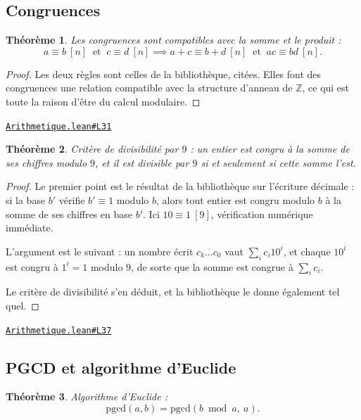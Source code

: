 \documentclass[11pt,a4paper]{article}
\theoremstyle{definition}
\theoremstyle{plain}
\newtheorem{theoreme}{Théorème}
\newcommand{\source}[2]{\par\smallskip\noindent\hfill{\footnotesize\href{#1}{\texttt{#2}}}\par\smallskip}
\begin{document}
\subsection{Congruences}

\begin{theoreme}
Les congruences sont compatibles avec la somme et le produit :
\[ a \equiv b \ [n] \ \text{ et } \ c \equiv d \ [n]
   \implies a + c \equiv b + d \ [n] \ \text{ et } \ ac \equiv bd \ [n] . \]
\end{theoreme}

\begin{proof}
Les deux règles sont celles de la bibliothèque, citées. Elles font des congruences une
relation compatible avec la structure d'anneau de $\mathbb{Z}$, ce qui est toute la raison
d'être du calcul modulaire.
\end{proof}
\source{https://github.com/Commutator-IO/learn-lean/blob/main/cours/02-lycee/10-specialite-mathematiques-terminale-s/Arithmetique.lean\#L31}{Arithmetique.lean\#L31}

\begin{theoreme}
Critère de divisibilité par $9$ : un entier est congru à la somme de ses chiffres
modulo $9$, et il est divisible par $9$ si et seulement si cette somme l'est.
\end{theoreme}

\begin{proof}
Le premier point est le résultat de la bibliothèque sur l'écriture décimale : si la base
$b'$ vérifie $b' \equiv 1$ modulo $b$, alors tout entier est congru modulo $b$ à la somme
de ses chiffres en base $b'$. Ici $10 \equiv 1 \ [9]$, vérification numérique immédiate.

L'argument est le suivant : un nombre écrit $\overline{c_k \dots c_0}$ vaut
$\sum_i c_i 10^{i}$, et chaque $10^{i}$ est congru à $1^{i} = 1$ modulo $9$, de sorte que
la somme est congrue à $\sum_i c_i$.

Le critère de divisibilité s'en déduit, et la bibliothèque le donne également tel quel.
\end{proof}
\source{https://github.com/Commutator-IO/learn-lean/blob/main/cours/02-lycee/10-specialite-mathematiques-terminale-s/Arithmetique.lean\#L37}{Arithmetique.lean\#L37}

\subsection{PGCD et algorithme d'Euclide}

\begin{theoreme}
Algorithme d'Euclide :
\[ \mathrm{pgcd}(a, b) = \mathrm{pgcd}(b \bmod a,\ a) . \]
\end{theoreme}
\end{document}
